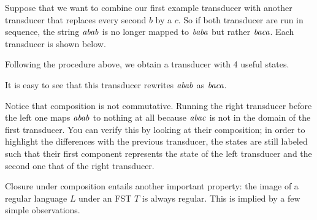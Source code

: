 \begin{examplebox}
    Suppose that we want to combine our first example transducer with another transducer that replaces every second $b$ by a $c$.
    So if both transducer are run in sequence, the string $\mathit{abab}$ is no longer mapped to $\mathit{baba}$ but rather $\mathit{baca}$.
    Each transducer is shown below.
    \begin{center}
        
        
    \end{center}
    Following the procedure above, we obtain a transducer with 4 useful states.
    \begin{center}
        
    \end{center}
    It is easy to see that this transducer rewrites $\mathit{abab}$ as $\mathit{baca}$. 

    Notice that composition is not commutative.
    Running the right transducer before the left one maps $\mathit{abab}$ to nothing at all because $\mathit{abac}$ is not in the domain of the first transducer.
    You can verify this by looking at their composition; in order to highlight the differences with the previous transducer, the states are still labeled such that their first component represents the state of the left transducer and the second one that of the right transducer.
    \begin{center}
        
    \end{center}
\end{examplebox}
%
Closure under composition entails another important property: the image of a regular language $L$ under an FST $T$ is always regular.
This is implied by a few simple observations.
%
